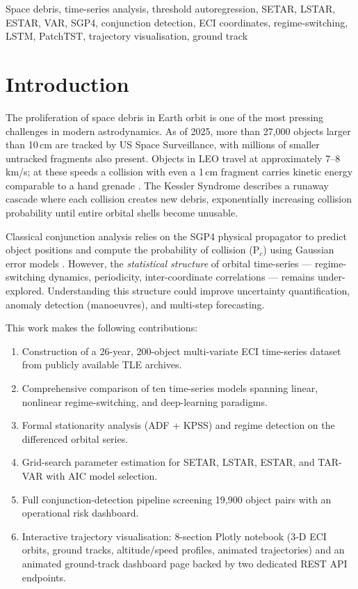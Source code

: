 \documentclass[conference]{IEEEtran}
\begin{document}
\begin{IEEEkeywords}
Space debris, time-series analysis, threshold autoregression, SETAR,
LSTAR, ESTAR, VAR, SGP4, conjunction detection, ECI coordinates,
regime-switching, LSTM, PatchTST, trajectory visualisation, ground track
\end{IEEEkeywords}

\section{Introduction}
\label{sec:intro}

The proliferation of space debris in Earth orbit is one of the most pressing
challenges in modern astrodynamics. As of 2025, more than 27{,}000 objects
larger than 10\,cm are tracked by US Space Surveillance, with millions of
smaller untracked fragments also present. Objects in LEO travel at
approximately 7--8\,km/s; at these speeds a collision with even a 1\,cm
fragment carries kinetic energy comparable to a hand grenade
\cite{kessler1978}. The Kessler Syndrome \cite{kessler1978} describes a
runaway cascade where each collision creates new debris, exponentially
increasing collision probability until entire orbital shells become unusable.

Classical conjunction analysis relies on the SGP4 \cite{hoots1980} physical
propagator to predict object positions and compute the probability of
collision (P$_c$) using Gaussian error models \cite{chan2008}. However, the
\emph{statistical structure} of orbital time-series --- regime-switching
dynamics, periodicity, inter-coordinate correlations --- remains
under-explored. Understanding this structure could improve uncertainty
quantification, anomaly detection (manoeuvres), and multi-step forecasting.

This work makes the following contributions:
\begin{enumerate}
  \item Construction of a 26-year, 200-object multi-variate ECI time-series
        dataset from publicly available TLE archives.
  \item Comprehensive comparison of ten time-series models spanning linear,
        nonlinear regime-switching, and deep-learning paradigms.
  \item Formal stationarity analysis (ADF + KPSS) and regime detection on
        the differenced orbital series.
  \item Grid-search parameter estimation for SETAR, LSTAR, ESTAR, and
        TAR-VAR with AIC model selection.
  \item Full conjunction-detection pipeline screening 19{,}900 object pairs
        with an operational risk dashboard.
  \item Interactive trajectory visualisation: 8-section Plotly notebook
        (3-D ECI orbits, ground tracks, altitude/speed profiles, animated
        trajectories) and an animated ground-track dashboard page backed
        by two dedicated REST API endpoints.
\end{enumerate}
\end{document}
